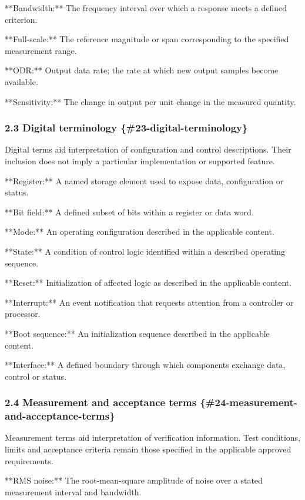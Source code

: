 \documentclass[11pt]{article}
\begin{document}
**Bandwidth:** The frequency interval over which a response meets a defined criterion.

**Full-scale:** The reference magnitude or span corresponding to the specified measurement range.

**ODR:** Output data rate; the rate at which new output samples become available.

**Sensitivity:** The change in output per unit change in the measured quantity.

\subsubsection{2.3 Digital terminology \{\#23-digital-terminology\}}


Digital terms aid interpretation of configuration and control descriptions. Their inclusion does not imply a particular implementation or supported feature.

**Register:** A named storage element used to expose data, configuration or status.

**Bit field:** A defined subset of bits within a register or data word.

**Mode:** An operating configuration described in the applicable content.

**State:** A condition of control logic identified within a described operating sequence.

**Reset:** Initialization of affected logic as described in the applicable content.

**Interrupt:** An event notification that requests attention from a controller or processor.

**Boot sequence:** An initialization sequence described in the applicable content.

**Interface:** A defined boundary through which components exchange data, control or status.

\subsubsection{2.4 Measurement and acceptance terms \{\#24-measurement-and-acceptance-terms\}}


Measurement terms aid interpretation of verification information. Test conditions, limits and acceptance criteria remain those specified in the applicable approved requirements.

**RMS noise:** The root-mean-square amplitude of noise over a stated measurement interval and bandwidth.
\end{document}
